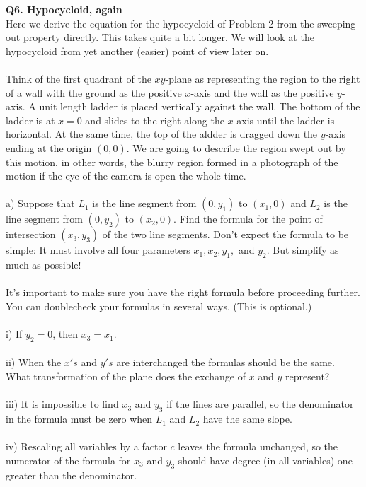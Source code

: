 \documentclass[9pt]{article}
\begin{document}
\begin{tcolorbox}
  \textbf{Q6. Hypocycloid, again} \\
  Here we derive the equation for the hypocycloid of Problem 2 from the sweeping out property directly. This takes quite a bit longer. We will look at the hypocycloid from yet another (easier) point of view later on. \\
  \\
  Think of the first quadrant of the $xy$-plane as representing the region to the right of a wall with the ground as the positive $x$-axis and the wall as the positive $y$-axis. A unit length ladder is placed vertically against the wall. The bottom of the ladder is at $x = 0$ and slides to the right along the $x$-axis until the ladder is horizontal. At the same time, the top of the aldder is dragged down the $y$-axis ending at the origin $(0, 0)$. We are going to describe the region swept out by this motion, in other words, the blurry region formed in a photograph of the motion if the eye of the camera is open the whole time.\\
  \\
  a) Suppose that $L_1$ is the line segment from $(0,y_1)$ to $(x_1,0)$ and $L_2$ is the line segment from $(0,y_2)$ to $(x_2,0)$. Find the formula for the point of intersection $(x_3,y_3)$ of the two line segments. Don't expect the formula to be simple: It must involve all four parameters $x_1, x_2, y_1,$ and $y_2$. But simplify as much as possible! \\
  \\
  It's important to make sure you have the right formula before proceeding further. You can doublecheck your formulas in several ways. (This is optional.)\\
  \\
  i) If $y_2 = 0$, then $x_3 = x_1$.\\
  \\
  ii) When the $x's$ and $y's$ are interchanged the formulas should be the same. What transformation of the plane does the exchange of $x$ and $y$ represent?\\
  \\
  iii) It is impossible to find $x_3$ and $y_3$ if the lines are parallel, so the denominator in the formula must be zero when $L_1$ and $L_2$ have the same slope.\\
  \\
  iv) Rescaling all variables by a factor $c$ leaves the formula unchanged, so the numerator of the formula for $x_3$ and $y_3$ should have degree (in all variables) one greater than the denominator.
\end{tcolorbox}
\end{document}
